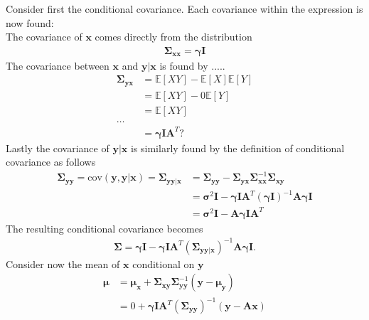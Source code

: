 Consider first the conditional covariance. Each covariance within the expression is now found:\\
The covariance of $\textbf{x}$ comes directly from the distribution  
\begin{align*}
\boldsymbol{\Sigma}_{\textbf{xx}} = \boldsymbol{\gamma}\textbf{I}
\end{align*} 
The covariance between $\textbf{x}$ and $\textbf{y}\vert\textbf{x}$ is found by .....
\begin{align*}
\boldsymbol{\Sigma}_{\textbf{yx}} &= \mathbb{E}[XY] - \mathbb{E}[X]\mathbb{E}[Y]\\
&= \mathbb{E}[XY] - 0 \mathbb{E}[Y] \\
&= \mathbb{E}[XY]\\
\hdots \\
&= \boldsymbol{\gamma}\textbf{I}\textbf{A}^T?
\end{align*}
Lastly the covariance of $\textbf{y}\vert \textbf{x}$ is similarly found by the definition of conditional covariance as follows 
\begin{align*}
\boldsymbol{\Sigma}_{\textbf{yy}} =  \text{cov}(\textbf{y},\textbf{y}\vert \textbf{x}) = \boldsymbol{\Sigma}_{\textbf{yy}\vert \textbf{x}} &= \boldsymbol{\Sigma}_{\textbf{yy}} - \boldsymbol{\Sigma}_{\textbf{yx}}\boldsymbol{\Sigma}_{\textbf{xx}}^{-1}\boldsymbol{\Sigma}_{\textbf{xy}} \\
&= \boldsymbol{\sigma}^2 \textbf{I} - \boldsymbol{\gamma}\textbf{I}\textbf{A}^T (\boldsymbol{\gamma}\textbf{I})^{-1} \textbf{A}\boldsymbol{\gamma}\textbf{I} \\
&= \boldsymbol{\sigma}^2 \textbf{I} - \textbf{A}\boldsymbol{\gamma}\textbf{I}\textbf{A}^T
\end{align*} 
The resulting conditional covariance becomes 
\begin{align*}
\boldsymbol{\Sigma} = \boldsymbol{\gamma}\textbf{I} - \boldsymbol{\gamma}\textbf{I}\textbf{A}^T (\boldsymbol{\Sigma}_{\textbf{yy}\vert \textbf{x}})^{-1} \textbf{A} \boldsymbol{\gamma}\textbf{I}.
\end{align*}
Consider now the mean of $\textbf{x}$ conditional on $\textbf{y}$
\begin{align*}
\boldsymbol{\mu} &= \boldsymbol{\mu}_{\textbf{x}}+\boldsymbol{\Sigma}_{\textbf{xy}}\boldsymbol{\Sigma}_{\textbf{yy}}^{-1}\left( \textbf{y}-\boldsymbol{\mu}_{\textbf{y}}\right) \\
&= 0 + \boldsymbol{\gamma}\textbf{I}\textbf{A}^T \left( \boldsymbol{\Sigma}_{\textbf{yy}}\right)^{-1}\left(\textbf{y}-\textbf{Ax}\right)
\end{align*}  

